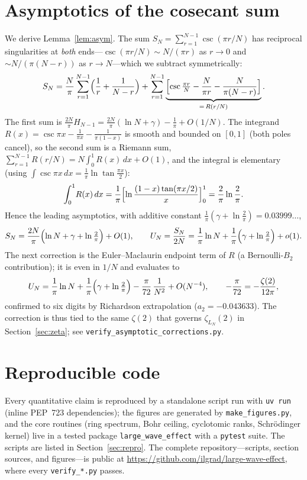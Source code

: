 \documentclass[11pt,reqno]{amsart}
\theoremstyle{plain}
\theoremstyle{definition}
\newcommand{\LN}{L_N}
\begin{document}
\section{Asymptotics of the cosecant sum}\label{app:bernoulli}
We derive Lemma~\ref{lem:asym}. The sum $S_N=\sum_{r=1}^{N-1}\csc(\pi r/N)$ has reciprocal singularities
at \emph{both} ends---$\csc(\pi r/N)\sim N/(\pi r)$ as $r\to0$ and $\sim N/(\pi(N-r))$ as $r\to N$---which
we subtract symmetrically:
\[
  S_N=\frac N\pi\sum_{r=1}^{N-1}\Bigl(\frac1r+\frac1{N-r}\Bigr)
      +\sum_{r=1}^{N-1}\underbrace{\Bigl[\csc\tfrac{\pi r}N-\frac N{\pi r}-\frac N{\pi(N-r)}\Bigr]}_{=\,R(r/N)} .
\]
The first sum is $\tfrac{2N}\pi H_{N-1}=\tfrac{2N}\pi(\ln N+\gamma)-\tfrac1\pi+O(1/N)$. The integrand
$R(x)=\csc\pi x-\tfrac1{\pi x}-\tfrac1{\pi(1-x)}$ is smooth and bounded on $[0,1]$ (both poles cancel), so
the second sum is a Riemann sum, $\sum_{r=1}^{N-1}R(r/N)=N\!\int_0^1\!R(x)\,dx+O(1)$, and the integral is
elementary (using $\int\csc\pi x\,dx=\tfrac1\pi\ln\tan\tfrac{\pi x}2$):
\[
  \int_0^1\!R(x)\,dx=\frac1\pi\Bigl[\ln\frac{(1-x)\tan(\pi x/2)}{x}\Bigr]_0^1=\frac2\pi\ln\frac2\pi .
\]
Hence the leading asymptotics, with additive constant $\tfrac1\pi(\gamma+\ln\tfrac2\pi)=0.03999\ldots$,
\[
  S_N=\frac{2N}\pi\Bigl(\ln N+\gamma+\ln\tfrac2\pi\Bigr)+O(1),
  \qquad U_N=\frac{S_N}{2N}=\frac1\pi\ln N+\frac1\pi\Bigl(\gamma+\ln\tfrac2\pi\Bigr)+o(1).
\]
The next correction is the Euler--Maclaurin endpoint term of $R$ (a Bernoulli-$B_2$ contribution); it is
even in $1/N$ and evaluates to
\[
  U_N=\frac1\pi\ln N+\frac1\pi\Bigl(\gamma+\ln\tfrac2\pi\Bigr)-\frac{\pi}{72}\,\frac1{N^2}+O(N^{-4}),
  \qquad -\frac{\pi}{72}=-\frac{\zeta(2)}{12\pi},
\]
confirmed to six digits by Richardson extrapolation ($a_2=-0.043633$). The correction is thus tied to the
same $\zeta(2)$ that governs $\zeta_{\LN}(2)$ in Section~\ref{sec:zeta}; see
\texttt{verify\_asymptotic\_corrections.py}.

\section{Reproducible code}\label{app:code}
Every quantitative claim is reproduced by a standalone script run with \texttt{uv run} (inline
PEP~723 dependencies); the figures are generated by \texttt{make\_figures.py}, and the core routines
(ring spectrum, Bohr ceiling, cyclotomic ranks, Schr\"odinger kernel) live in a tested package
\texttt{large\_wave\_effect} with a \texttt{pytest} suite. The scripts are listed in
Section~\ref{sec:repro}. The complete repository---scripts, section sources, and figures---is public at
\url{https://github.com/ilgrad/large-wave-effect}, where every \texttt{verify\_*.py} passes.
\end{document}
